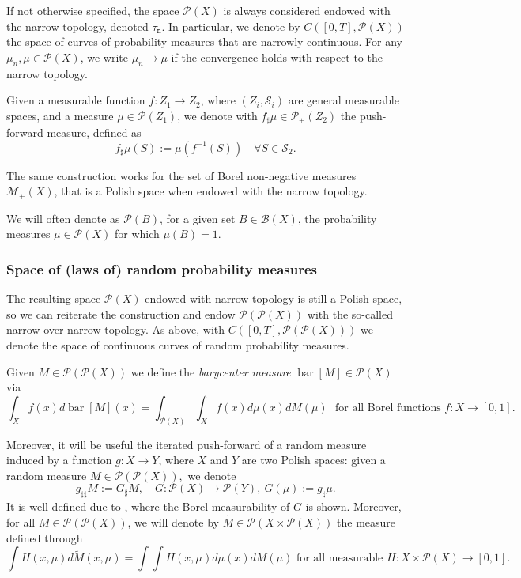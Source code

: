 \documentclass[10pt,leqno]{amsart}
\numberwithin{equation}{section}
\newcommand{\PP}{\mathcal{P}}
\begin{document}
If not otherwise specified, the space $\PP(X)$ is always considered endowed with the narrow topology, denoted $\tau_{\mathtt{n}}$. In particular, we denote by $C([0,T],\PP(X))$ the space of curves of probability measures that are narrowly continuous. For any $\mu_n,\mu \in \PP(X)$, we write $\mu_n \to \mu$ if the convergence holds with respect to the narrow topology.

Given a measurable function $f:Z_1 \to Z_2$, where $(Z_i,\mathcal{S}_i)$ are general measurable spaces, and a measure $\mu\in \PP(Z_1)$, we denote with $f_\sharp\mu \in \PP_+(Z_2)$ the push-forward measure, defined as 
\[f_\sharp\mu(S) := \mu(f^{-1}(S)) \quad \forall S\in \mathcal{S}_2.\]

The same construction works for the set of Borel non-negative measures $\mathcal{M}_+(X)$, that is a Polish space when endowed with the narrow topology.

We will often denote as $\PP(B)$, for a given set $B\in \mathcal{B}(X)$, the probability measures $\mu \in \PP(X)$ for which $\mu(B) = 1$.

\subsubsection{Space of (laws of) random probability measures} The resulting space $\PP(X)$ endowed with narrow topology is still a Polish space, so we can reiterate the construction and endow $\PP(\PP(X))$ with the so-called narrow over narrow topology. As above, with $C([0,T],\PP(\PP(X)))$ we denote the space of continuous curves of random probability measures.

Given $M\in \PP(\PP(X))$ we define the \textit{barycenter measure} $\operatorname{bar}[M]\in \PP(X)$ via 
\begin{equation}\label{eq: bar}
    \int_{X} f(x) d\operatorname{bar}[M](x) = \int_{\PP(X)}\int_X f(x) d\mu(x) dM(\mu) \ \ \  \text{for all Borel functions }f:X \to [0,1].
\end{equation}

Moreover, it will be useful the iterated push-forward of a random measure induced by a function $g:X \to Y$, where $X$ and $Y$ are two Polish spaces: given a random measure $M\in \PP(\PP(X)),$ we denote 
\begin{equation}\label{eq: double push forward}
g_{\sharp\sharp}M:= G_{\sharp}M, \quad G:\PP(X) \to \PP(Y), \ G(\mu) := g_\sharp\mu.
\end{equation}
It is well defined due to \cite[Appendix D]{pinzisavare2025}, where the Borel measurability of $G$ is shown. Moreover, for all $M\in \PP(\PP(X))$, we will denote by $\widetilde{M} \in \PP(X\times \PP(X))$ the measure defined through
\begin{equation}\label{eq: widetilde M}
    \int H(x,\mu) d\widetilde{M}(x,\mu) = \int \int H(x,\mu) d\mu(x) dM(\mu) \text{ for all measurable }H:X\times \PP(X) \to [0,1]. 
\end{equation}
\end{document}
